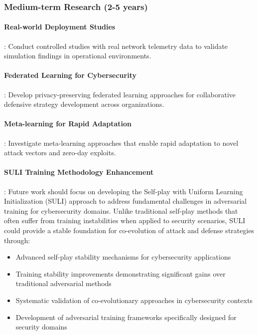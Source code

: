 \documentclass[12pt,oneside]{article}
\begin{document}
\subsubsection{Medium-term Research (2-5 years)}

\paragraph{Real-world Deployment Studies}: Conduct controlled studies with real network telemetry data to validate simulation findings in operational environments.

\paragraph{Federated Learning for Cybersecurity}: Develop privacy-preserving federated learning approaches for collaborative defensive strategy development across organizations.

\paragraph{Meta-learning for Rapid Adaptation}: Investigate meta-learning approaches that enable rapid adaptation to novel attack vectors and zero-day exploits.

\paragraph{SULI Training Methodology Enhancement}: Future work should focus on developing the Self-play with Uniform Learning Initialization (SULI) approach to address fundamental challenges in adversarial training for cybersecurity domains. Unlike traditional self-play methods that often suffer from training instabilities when applied to security scenarios, SULI could provide a stable foundation for co-evolution of attack and defense strategies through:
\begin{itemize}
\item Advanced self-play stability mechanisms for cybersecurity applications
\item Training stability improvements demonstrating significant gains over traditional adversarial methods
\item Systematic validation of co-evolutionary approaches in cybersecurity contexts
\item Development of adversarial training frameworks specifically designed for security domains
\end{itemize}
\end{document}
